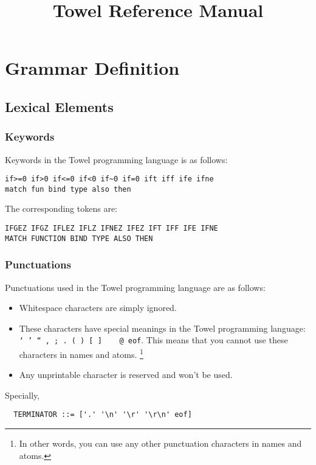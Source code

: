 \documentclass{book}
\title{Towel Reference Manual}
\begin{document}
\maketitle
\tableofcontents

\chapter{Grammar Definition}\label{chap:grammar}
\section{Lexical Elements}

\subsection{Keywords}

Keywords in the Towel programming language is as follows:
\begin{verbatim}
if>=0 if>0 if<=0 if<0 if~0 if=0 ift iff ife ifne
match fun bind type also then
\end{verbatim}

The corresponding tokens are:
\begin{verbatim}
IFGEZ IFGZ IFLEZ IFLZ IFNEZ IFEZ IFT IFF IFE IFNE
MATCH FUNCTION BIND TYPE ALSO THEN
\end{verbatim}

\subsection{Punctuations}

Punctuations used in the Towel programming language are as follows:

\begin{itemize}
\item Whitespace characters are simply ignored.
\item These characters have special meanings in the Towel programming language: \texttt{` ' `` , ; . ( ) [ ] { } \ @ eof}. This means that you cannot use these characters in names and atoms. \footnote{In other words, you can use any other punctuation characters in names and atoms.}
\item Any unprintable character is reserved and won't be used.
\end{itemize}

Specially,
\begin{verbatim}
  TERMINATOR ::= ['.' '\n' '\r' '\r\n' eof]
\end{verbatim}
\end{document}
